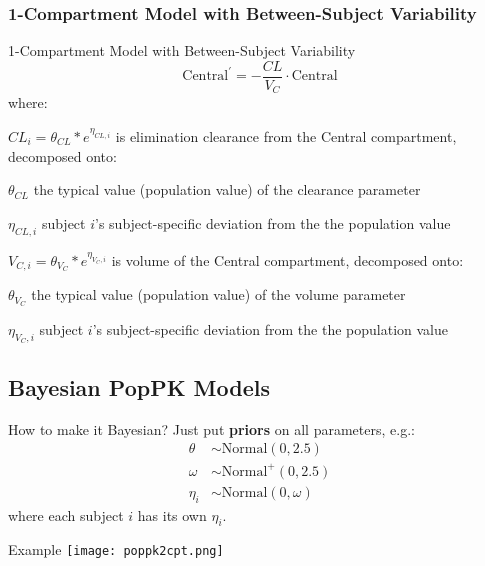 \subsubsection{1-Compartment Model with Between-Subject Variability}
\begin{frame}{1-Compartment Model with Between-Subject Variability}
    $$
        \text{Central}^{\prime} = -\frac{CL}{V_C} \cdot \text{Central}
    $$
    where:
    \begin{vfilleditems}
        \item $CL_i = \theta_{CL} * e^{\eta_{CL,i}}$ is elimination clearance from the Central compartment,
        decomposed onto:
        \begin{vfilleditems}
            \item $\theta_{CL}$ the typical value (population value) of the clearance parameter
            \item $\eta_{CL, i}$ subject $i$'s subject-specific deviation from the the population value
        \end{vfilleditems}
        \item $V_{C,i} = \theta_{V_C} * e^{\eta_{V_C,i}}$ is volume of the Central compartment,
        decomposed onto:
        \begin{vfilleditems}
            \item $\theta_{V_C}$ the typical value (population value) of the volume parameter
            \item $\eta_{V_C,i}$ subject $i$'s subject-specific deviation from the the population value
        \end{vfilleditems}
    \end{vfilleditems}
\end{frame}

\subsection{Bayesian PopPK Models}
\begin{frame}{How to make it Bayesian?}
    Just put \textbf{priors} on all parameters, e.g.:
    $$
        \begin{aligned}
            \theta   & \sim \text{Normal}(0, 2.5)  \\
            \omega   & \sim \text{Normal}^+(0, 2.5)  \\
            \eta_{i} & \sim \text{Normal}(0, \omega)
        \end{aligned}
    $$
    \vfill
    where each subject $i$ has its own $\eta_i$.
\end{frame}

\begin{frame}{Example}
    \centering
    \texttt{[image: poppk2cpt.png]}
\end{frame}
